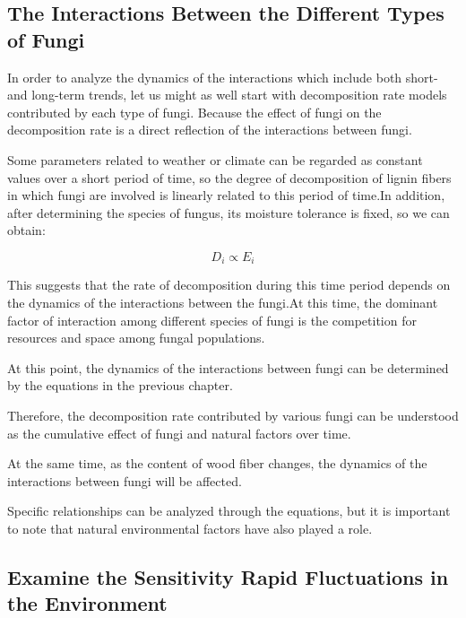 \documentclass[12pt]{article}
\begin{document}



\subsection{The Interactions Between the Different Types of Fungi}

In order to analyze the dynamics of the interactions which include both short- and long-term trends, let us might as well start with decomposition rate models contributed by each type of fungi. Because the effect of fungi on the decomposition rate is a direct reflection of the interactions between fungi.\par

Some parameters related to weather or climate can be regarded as constant values over a short period of time, so the degree of decomposition of lignin fibers in which fungi are involved is linearly related to this period of time.In addition, after determining the species of fungus, its moisture tolerance is fixed, so we can obtain:\par

$$
D_i \varpropto E_i
$$


This suggests that the rate of decomposition during this time period depends on the dynamics of the interactions between the fungi.At this time, the dominant factor of interaction among different species of fungi is the competition for resources and space among fungal populations.\par 

At this point, the dynamics of the interactions between fungi can be determined by the equations in the previous chapter.\par
Therefore, the decomposition rate contributed by various fungi can be understood as the cumulative effect of fungi and natural factors over time.\par
At the same time, as the content of wood fiber changes, the dynamics of the interactions between fungi will be affected.\par 
Specific relationships can be analyzed through the equations, but it is important to note that natural environmental factors have also played a role.\par

\subsection{Examine the Sensitivity Rapid Fluctuations in the Environment}
\end{document}
